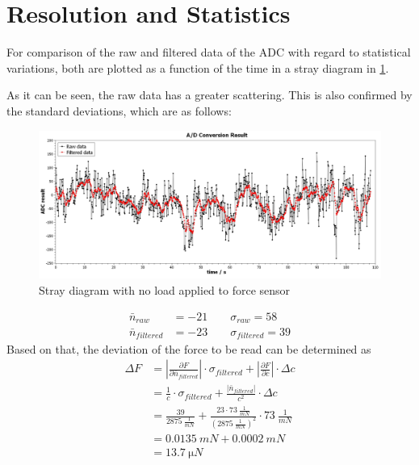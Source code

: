     \section{Resolution and Statistics}
        For comparison of the raw and filtered data of the ADC with regard to statistical variations, both are
        plotted as a function of the time in a stray diagram in \cref{fig:adc_result}.\par
        As it can be seen, the raw data has a greater scattering. This is also confirmed by the standard deviations, which are as follows:
        \begin{figure}[h]
            \centering\includegraphics[width=.9\textwidth]{scidavis/ADC_result.jpg}
            \caption[Stray diagram with no load applied to force sensor]{Stray diagram with no load applied to force sensor}
            \label{fig:adc_result}
        \end{figure}
        \begin{align*}
            \bar{n}_{raw}       &=-21 \qquad \sigma_{raw}=58\\
            \bar{n}_{filtered}  &=-23 \qquad \sigma_{filtered}=39
        \end{align*}
        Based on that, the deviation of the force to be read can be determined as
        \begin{align}
            \Delta F    &=\left| \frac{\partial F}{\partial \bar{n}_{filtered}} \right| \cdot \sigma_{filtered} + \left| \frac{\partial F}{\partial c} \right| \cdot \Delta c \nonumber \\
                        &=\frac{1}{c} \cdot \sigma_{filtered} + \frac{\left|\bar{n}_{filtered}\right|}{c^2} \cdot \Delta c \nonumber \\
                        &=\frac{39}{\SI{2875}{\frac{1}{mN}}} + \frac{23 \cdot \SI{73}{\frac{1}{mN}}}{(\SI{2875}{\frac{1}{mN}})^2} \cdot \SI{73}{\frac{1}{mN}} \nonumber \\
                        &=\SI{0.0135}{mN}+\SI{0.0002}{mN} \nonumber \\
                        &=\SI{13.7}{\micro N}
        \end{align}
